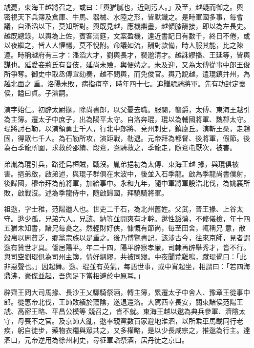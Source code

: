 \begin{pinyinscope}
 虓薨，東海王越將召之，或曰：「輿猶膩也，近則污人。」及至，越疑而御之。輿
 密視天下兵簿及倉庫、牛馬、器械、水陸之形，皆默識之。是時軍國多事，每會議，自潘滔以下，莫知所對。輿既見越，應機辯畫，越傾膝酬接，即以為左長史。越既總錄，以輿為上佐，賓客滿筵，文案盈機，遠近書記日有數千，終日不倦，或以夜繼之，皆人人懽暢，莫不悅附。命議如流，酬對款備，時人服其能，比之陳遵。時稱越府有三才：潘滔大才，劉輿長才，裴邈清才。越誅繆播、王延等，皆輿謀也。延愛妾荊氏有音伎，延尚未殮，輿便娉之。未及迎，又為太傅從事中郎王俊所爭奪。御史中取丞傅宣劾奏，越不問輿，而免俊官。輿乃說越，遣琨鎮并州，為越北面之
 重。洛陽未敗，病指疽卒，時年四十七。追贈驃騎將軍。先有功封定襄侯，謚曰貞。子演嗣。



 演字始仁。初辟太尉掾，除尚書郎，以父憂去職。服闋，襲爵，太傅、東海王越引為主簿。遷太子中庶子，出為陽平太守。自洛奔琨，琨以為輔國將軍、魏郡太守。琨將討石勒，以演領勇士千人，行北中郎將、兗州刺史，鎮廩丘。演斬王桑，走趙固，得眾七千人。為石勒所攻，演距戰，勒退。元帝拜為都督、後將軍，假節。後為石季龍所圍，求救於邵續、段鴦，鴦騎救之，季龍走，隨鴦屯厭次，被害。



 弟胤為琨引兵，路逢烏桓賊，戰沒。胤弟挹初為太傅、東海王越
 掾，與琨俱被害。挹弟啟，啟弟述，與琨子群俱在末波中，後並入石季龍。啟為季龍尚書僕射，後歸國，穆帝拜為前將軍，加給事中。永和九年，隨中軍將軍殷浩北伐，為姚襄所敗，啟戰沒。述為季龍侍中，隨啟歸國，拜驍騎將軍。



 祖逖，字士稚，范陽遒人也。世吏二千石，為北州舊姓。父武，晉王掾、上谷太守。逖少孤，兄弟六人。兄該、納等並開爽有才幹。逖性豁蕩，不修儀檢，年十四五猶未知書，諸兄每憂之。然輕財好俠，慷慨有節尚，每至田舍，輒稱兄
 意，散穀帛以周貧乏，鄉黨宗族以是重之。後乃博覽書記，該涉古今，往來京師，見者謂逖有贊世才具。僑居陽平。年二十四，陽平辟察孝廉，司隸再辟舉秀才，皆不行。與司空劉琨俱為司州主簿，情好綢繆，共被同寢。中夜聞荒雞鳴，蹴琨覺曰：「此非惡聲也。」因起舞。逖、琨並有英氣，每語世事，或中宵起坐，相謂曰：「若四海鼎沸，豪傑並起，吾與足下當相避於中原耳。」



 辟齊王冏大司馬掾、長沙王乂驃騎祭酒，轉主簿，累遷太子中舍人、豫章王從事中郎。從惠帝北伐，王師敗績於蕩陰，遂退還洛。大駕西幸長安，關東諸侯范陽王虓、高密王略、平昌公模等
 競召之，皆不就。東海王越以逖為典兵參軍、濟陰太守，母喪不之官。及京師大亂，逖率親黨數百家避地淮泗，以所乘車馬載同行老疾，躬自徒步，藥物衣糧與眾共之，又多權略，是以少長咸宗之，推逖為行主。達泗口，元帝逆用為徐州刺史，尋征軍諮祭酒，居丹徒之京口。




\end{pinyinscope}
